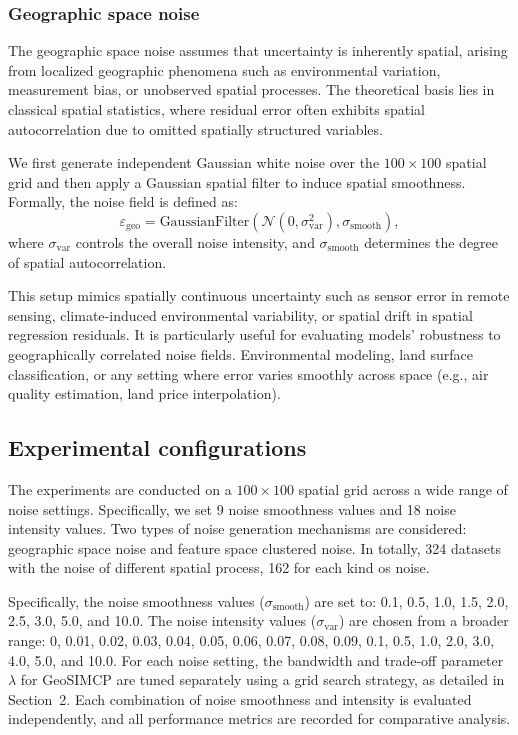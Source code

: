 \documentclass[authoryear,preprint,review,12pt]{elsarticle}
\begin{document}
\subsubsection{Geographic space noise}

The geographic space noise assumes that uncertainty is inherently spatial, arising from localized geographic phenomena such as environmental variation, measurement bias, or unobserved spatial processes. The theoretical basis lies in classical spatial statistics, where residual error often exhibits spatial autocorrelation due to omitted spatially structured variables.

We first generate independent Gaussian white noise over the \(100 \times 100\) spatial grid and then apply a Gaussian spatial filter to induce spatial smoothness. Formally, the noise field is defined as:
\begin{equation}
\varepsilon_{\text{geo}} = \text{GaussianFilter}\left( \mathcal{N}(0, \sigma_{\text{var}}^2), \sigma_{\text{smooth}} \right),
\end{equation}
where \(\sigma_{\text{var}}\) controls the overall noise intensity, and \(\sigma_{\text{smooth}}\) determines the degree of spatial autocorrelation.

This setup mimics spatially continuous uncertainty such as sensor error in remote sensing, climate-induced environmental variability, or spatial drift in spatial regression residuals. It is particularly useful for evaluating models’ robustness to geographically correlated noise fields. Environmental modeling, land surface classification, or any setting where error varies smoothly across space (e.g., air quality estimation, land price interpolation).






\subsection{Experimental configurations}

The experiments are conducted on a $100\times100$ spatial grid across a wide range of noise settings. Specifically, we set 9 noise smoothness values and 18 noise intensity values. Two types of noise generation mechanisms are considered: geographic space noise and feature space clustered noise. In totally, 324 datasets with the noise of different spatial process, 162 for each kind os noise.

Specifically, the noise smoothness values ($\sigma_{\text{smooth}}$) are set to: 0.1, 0.5, 1.0, 1.5, 2.0, 2.5, 3.0, 5.0, and 10.0. The noise intensity values ($\sigma_{\text{var}}$) are chosen from a broader range: 0, 0.01, 0.02, 0.03, 0.04, 0.05, 0.06, 0.07, 0.08, 0.09, 0.1, 0.5, 1.0, 2.0, 3.0, 4.0, 5.0, and 10.0. For each noise setting, the bandwidth and trade-off parameter $\lambda$ for GeoSIMCP are tuned separately using a grid search strategy, as detailed in Section~2. Each combination of noise smoothness and intensity is evaluated independently, and all performance metrics are recorded for comparative analysis.
\end{document}
